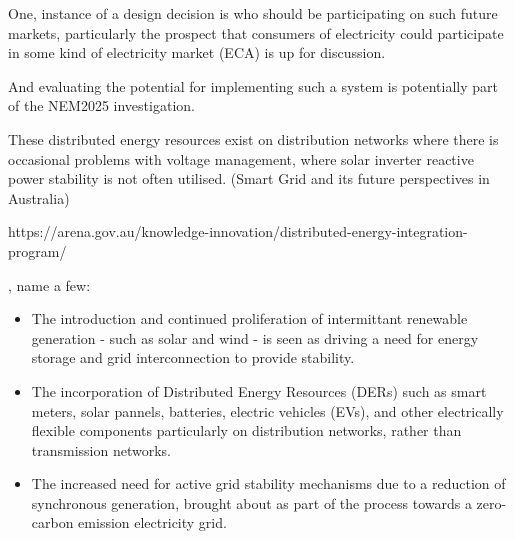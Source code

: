 One, instance of a design decision is who should be participating on such future markets, particularly the prospect that consumers of electricity could participate in some kind of electricity market (ECA) is up for discussion.


And evaluating the potential for implementing such a system is potentially part of the NEM2025 investigation.




These distributed energy resources exist on distribution networks where there is occasional problems with voltage management, where 
solar inverter reactive power stability is not often utilised. (Smart Grid and its future perspectives in Australia)


https://arena.gov.au/knowledge-innovation/distributed-energy-integration-program/



, \cite{BELL2018765} name a few:
\begin{itemize}
\item The introduction and continued proliferation of intermittant renewable generation - such as solar and wind - is seen as driving a need for energy storage and grid interconnection to provide stability.
\item The incorporation of Distributed Energy Resources (DERs) such as smart meters, solar pannels, batteries, electric vehicles (EVs), and other electrically flexible components particularly on distribution networks, rather than transmission networks.
\item The increased need for active grid stability mechanisms due to a reduction of synchronous generation, brought about as part of the process towards a zero-carbon emission electricity grid.
\end{itemize}


